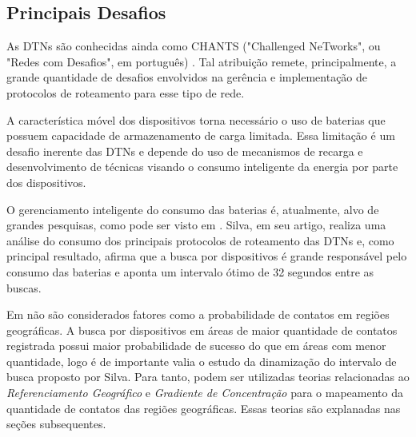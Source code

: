 \subsection{Principais Desafios}

As DTNs são conhecidas ainda como CHANTS ("Challenged NeTworks", ou "Redes com Desafios", em português) \cite{chen2006hybrid}. Tal atribuição remete, principalmente, a grande quantidade de desafios envolvidos na gerência e implementação de protocolos de roteamento para esse tipo de rede.

A característica móvel dos dispositivos torna necessário o uso de baterias que possuem capacidade de armazenamento de carga limitada. Essa limitação é um desafio inerente das DTNs e depende do uso de mecanismos de recarga e desenvolvimento de técnicas visando o consumo inteligente da energia por parte dos dispositivos.

O gerenciamento inteligente do consumo das baterias é, atualmente, alvo de grandes pesquisas, como pode ser visto em \cite{denis_artigo}. Silva, em seu artigo, realiza uma análise do consumo dos principais protocolos de roteamento das DTNs e, como principal resultado, afirma que a busca por dispositivos é grande responsável pelo consumo das baterias e aponta um intervalo ótimo de 32 segundos entre as buscas.

Em \cite{denis_artigo} não são considerados fatores como a probabilidade de contatos em regiões geográficas. A busca por dispositivos em áreas de maior quantidade de contatos registrada possui maior probabilidade de sucesso do que em áreas com menor quantidade, logo é de importante valia o estudo da dinamização do intervalo de busca proposto por Silva. Para tanto, podem ser utilizadas teorias relacionadas ao \emph{Referenciamento Geográfico} e \emph{Gradiente de Concentração} para o mapeamento da quantidade de contatos das regiões geográficas. Essas teorias são explanadas nas seções subsequentes.
